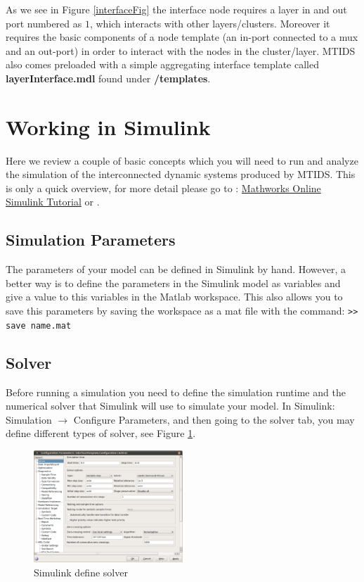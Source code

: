 \documentclass[a4paper,twoside, openright,12pt]{report}
\begin{document}
As we see in Figure \ref{interfaceFig} the interface node requires a layer in and out port numbered as $1$, which interacts with other layers/clusters. 
Moreover it requires the basic components of a node template (an in-port connected to a mux and an out-port) in order to interact with the nodes in the cluster/layer.
MTIDS also comes preloaded with a simple aggregating interface template called \textbf{layerInterface.mdl} found under \textbf{/templates}.
 


 

\section{Working in Simulink}\label{workinginsimulink}

Here we review a couple of basic concepts which you will need to run and analyze the simulation of the interconnected dynamic 
systems produced by MTIDS. This is only a quick overview, for more detail please go to : \href{http://www.mathworks.com/help/toolbox/simulink/simulink_product_page.html}{Mathworks Online Simulink Tutorial} or \cite{MatlabBuch}.

\subsection{Simulation Parameters}
The parameters of your model can be defined in Simulink by hand. However, a better way is to 
define the parameters in the Simulink model as variables and give a value to this variables in the Matlab workspace. This also allows you to save this parameters
by saving the workspace as a mat file with the command: \texttt{>> save name.mat}

\subsection{Solver} \label{solver}
Before running a simulation you need to define the simulation runtime and the numerical solver that Simulink will use to simulate your model.
In Simulink: Simulation $\rightarrow$ Configure Parameters, and then going to the solver tab, you may define different types of solver, see Figure \ref{simulink1Fig}.

\begin{figure}[htb]
\centering
\includegraphics[width=0.5\textwidth]{pics/screenSim1.eps}
\caption[Simulink define solver]{Simulink define solver}
\label{simulink1Fig}
\end{figure} 
\end{document}
